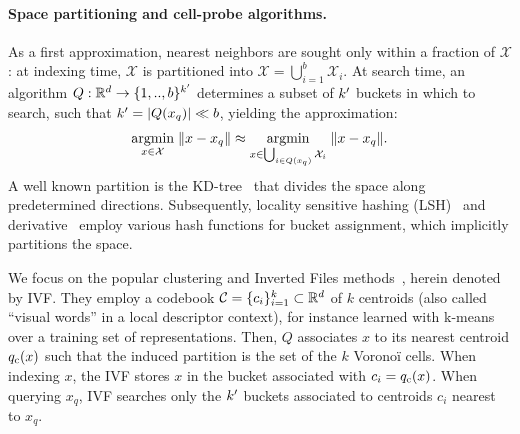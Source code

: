 \paragraph{Space partitioning and cell-probe algorithms.}
As a first approximation, 
nearest neighbors are sought only within a fraction of $\mathcal{X}$:
at indexing time, $\mathcal{X}$ is partitioned into $\mathcal X = \bigcup_{i=1}^{b} \mathcal{X}_i$.
At search time, an algorithm $Q: \mathbb{R}^d \to \{1,..,b\}^{k'}$ determines a subset of ${k'}$ buckets in which to search, such that ${k'}=|Q(x_q)| \ll b$, yielding the approximation: 
\begin{align}
    \mathop{\mathrm{argmin}}_{x \in \mathcal X} \; \lVert{x-x_q}\rVert
    \approx 
    \mathop{\mathrm{argmin}}_{x \in \bigcup_{i\in Q(x_q)} \mathcal{X}_i} \; \lVert{x-x_q}\rVert.
\end{align}
A well known partition is the KD-tree~\citep{bentley1975kdtree} that divides the space along predetermined directions.
Subsequently, locality sensitive hashing (LSH)~\citep{indyk1998lsh, gionis1999lsh} and derivative~\citep{datar2004lsh,pauleve2010locality} employ various hash functions for bucket assignment, which implicitly partitions the space.

We focus on the popular clustering and Inverted Files methods~\citep{sivic2003video}, herein denoted by IVF. 
They employ a codebook $\mathcal{C} = \{c_i\}_{i=1}^{k}\subset\mathbb{R}^d$ of $k$ centroids (also called ``visual words'' in a local descriptor context), for instance learned with k-means over a training set of representations. 
Then, $Q$ associates $x$ to its nearest centroid $q_\mathrm{c}(x)$ such that the induced partition is the set of the $k$ Voronoï cells.
When indexing $x$, the IVF stores $x$ in the bucket associated with $c_i=q_\mathrm{c}(x)$.
When querying $x_q$, IVF searches only the ${k'}$ buckets associated to centroids $c_i$ nearest to $x_q$.

